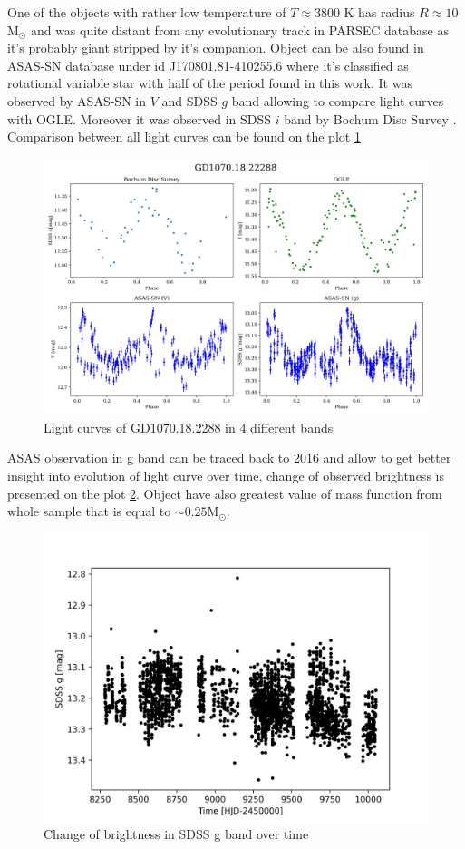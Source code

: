 \documentclass{pracalicmgr}
\begin{document}
One of the objects with rather low temperature of 
$T\approx 3800$ K has radius $R\approx 10$ $\textrm{M}_{\odot}$ and was quite distant from any evolutionary track in PARSEC database as it's probably giant stripped by 
it's companion. Object can be also found in ASAS-SN database \citep{jayasinghe_asas-sn_2019} under id J170801.81-410255.6 where it's classified as rotational variable star
with half of the period found in this work. It was observed by ASAS-SN in $V$ and SDSS $g$ band allowing to compare light curves with OGLE. Moreover 
it was observed in SDSS $i$ band by Bochum Disc Survey \citep{hackstein_bochum_2015}. Comparison between all light curves can be found on the plot \ref{comp}
\begin{figure}[H]
    \includegraphics[scale=0.5]{plots/GD1070.18.22288/lc_comparsion.png}
    \caption{Light curves of GD1070.18.2288 in $4$ different bands}\label{comp}
\end{figure}
ASAS observation in g band can be traced back to 2016 and allow to get better insight into evolution of light curve over time, change of observed brightness is presented on the
plot \ref{evolution}. Object have also greatest value of mass function from whole sample that is equal to $\sim 0.25 \textrm{M}_{\odot}$. 

\begin{figure}[H]
    \includegraphics{plots/GD1070.18.22288/visibility_over_time.png}
    \caption{Change of brightness in SDSS g band over time  }\label{evolution}
\end{figure}
\end{document}
